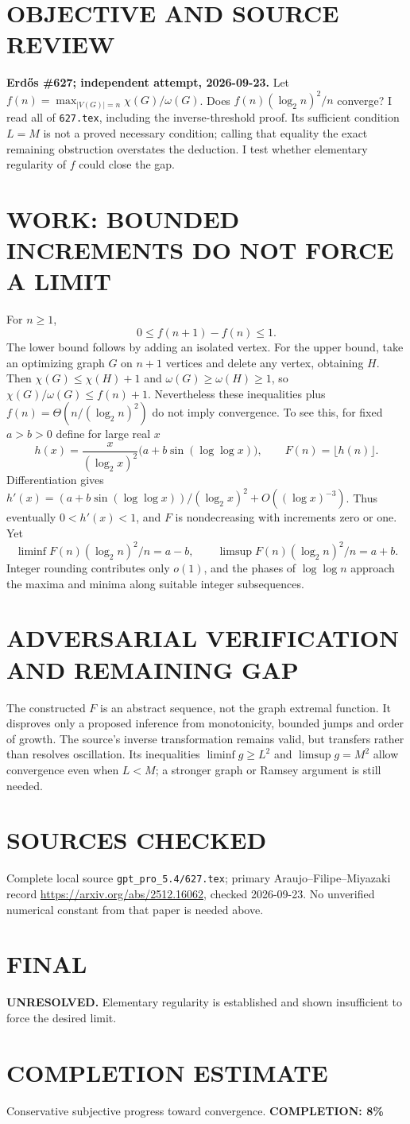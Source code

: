 \section{OBJECTIVE AND SOURCE REVIEW}
\textbf{Erd\H{o}s \#627; independent attempt, 2026-09-23.}
Let $f(n)=\max_{|V(G)|=n}\chi(G)/\omega(G)$. Does $f(n)(\log_2 n)^2/n$ converge? I read all of \texttt{627.tex}, including the inverse-threshold proof. Its sufficient condition $L=M$ is not a proved necessary condition; calling that equality the exact remaining obstruction overstates the deduction. I test whether elementary regularity of $f$ could close the gap.
\section{WORK: BOUNDED INCREMENTS DO NOT FORCE A LIMIT}
For $n\ge1$,
\[
0\le f(n+1)-f(n)\le1.
\]
The lower bound follows by adding an isolated vertex. For the upper bound, take an optimizing graph $G$ on $n+1$ vertices and delete any vertex, obtaining $H$. Then $\chi(G)\le\chi(H)+1$ and $\omega(G)\ge\omega(H)\ge1$, so
$\chi(G)/\omega(G)\le f(n)+1$.
Nevertheless these inequalities plus $f(n)=\Theta(n/(\log_2 n)^2)$ do not imply convergence. To see this, for fixed $a>b>0$ define for large real $x$
\[
h(x)=\frac{x}{(\log_2 x)^2}\bigl(a+b\sin(\log\log x)\bigr),
\qquad F(n)=\lfloor h(n)\rfloor.
\]
Differentiation gives $h'(x)=(a+b\sin(\log\log x))/(\log_2 x)^2+O((\log x)^{-3})$. Thus eventually $0<h'(x)<1$, and $F$ is nondecreasing with increments zero or one. Yet
\[
\liminf F(n)(\log_2n)^2/n=a-b,\qquad
\limsup F(n)(\log_2n)^2/n=a+b.
\]
Integer rounding contributes only $o(1)$, and the phases of $\log\log n$ approach the maxima and minima along suitable integer subsequences.
\section{ADVERSARIAL VERIFICATION AND REMAINING GAP}
The constructed $F$ is an abstract sequence, not the graph extremal function. It disproves only a proposed inference from monotonicity, bounded jumps and order of growth. The source's inverse transformation remains valid, but transfers rather than resolves oscillation. Its inequalities $\liminf g\ge L^2$ and $\limsup g=M^2$ allow convergence even when $L<M$; a stronger graph or Ramsey argument is still needed.
\section{SOURCES CHECKED}
Complete local source \texttt{gpt\_pro\_5.4/627.tex}; primary Araujo--Filipe--Miyazaki record \url{https://arxiv.org/abs/2512.16062}, checked 2026-09-23. No unverified numerical constant from that paper is needed above.
\section{FINAL}
\textbf{UNRESOLVED.} Elementary regularity is established and shown insufficient to force the desired limit.
\section{COMPLETION ESTIMATE}
Conservative subjective progress toward convergence.
\textbf{COMPLETION: 8\%}
